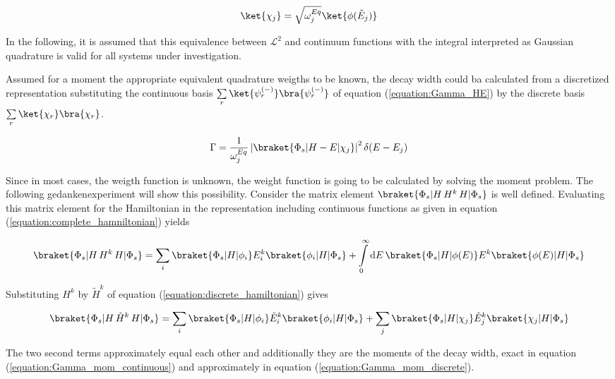 \begin{equation}
  \ket{\chi_j} = \sqrt{\omega_j^{Eq}} \ket{\phi(\tilde{E}_j)}
\end{equation}

In the following, it is assumed that this equivalence between $\mathcal{L}^2$
and continuum functions with the integral interpreted as Gaussian quadrature
is valid for all systems under investigation.

Assumed for a moment the appropriate equivalent quadrature
weigths to be known, the decay width could ba calculated from a
discretized representation substituting the continuous basis
$\sum\limits_{r} \ket{\psi_r^{(-)}} \bra{\psi_r^{(-)}}$ of
equation (\ref{equation:Gamma_HE}) by the discrete basis
$\sum\limits_{r} \ket{\chi_r} \bra{\chi_r}$.

\begin{equation} \label{equation:gamma_moments}
  \Gamma = \frac 1{\omega_{j}^{Eq}} \left| \braket{\Phi_s|H-E|\chi_j} \right|^2
           \delta(E-E_j)
\end{equation}

Since in most cases, the weigth function is unknown, the weight function
is going to be calculated by solving the moment problem.
The following gedankenexperiment will show this possibility.
Consider the matrix element $\braket{\Phi_s|H\,H^k\,H|\Phi_s}$ is well defined.
Evaluating this matrix element for the Hamiltonian in the representation including
continuous functions as given in equation (\ref{equation:complete_hamniltonian})
yields

\begin{equation}    \label{equation:Gamma_mom_continuous}
 \braket{\Phi_s|H\,H^k\,H|\Phi_s} = \sum\limits_i \braket{\Phi_s|H|\phi_i}E_i^k
                                    \braket{\phi_i|H|\Phi_s}
   + \int\limits_0^\infty \mathrm{d}E \, \braket{\Phi_s|H|\phi(E)} E^k
     \braket{\phi(E)|H|\Phi_s}
\end{equation}

Substituting $H^k$ by $\tilde{H}^k$ of equation (\ref{equation:discrete_hamiltonian})
gives

\begin{equation}  \label{equation:Gamma_mom_discrete}
 \braket{\Phi_s|H\,\tilde{H}^k\,H|\Phi_s} =
   \sum\limits_i \braket{\Phi_s|H|\phi_i}\tilde{E}_i^k
     \braket{\phi_i|H|\Phi_s}
   + \sum\limits_j \braket{\Phi_s|H|\chi_j} \tilde{E}_j^k
     \braket{\chi_j|H|\Phi_s}
\end{equation}

The two second terms approximately equal each other and additionally
they are the moments of the decay width, exact in equation
(\ref{equation:Gamma_mom_continuous})
and approximately in equation (\ref{equation:Gamma_mom_discrete}).

